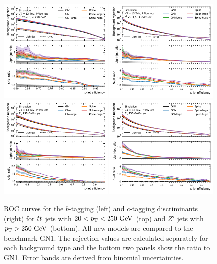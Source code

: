 \begin{figure}[ht]
    \centering
    \includegraphics[width=0.49\textwidth]{figures/flavour_tagging/b_roc_ttbar_large.pdf}
    \includegraphics[width=0.49\textwidth]{figures/flavour_tagging/c_roc_ttbar_large.pdf}
    \includegraphics[width=0.49\textwidth]{figures/flavour_tagging/b_roc_zprime_large.pdf}
    \includegraphics[width=0.49\textwidth]{figures/flavour_tagging/c_roc_zprime_large.pdf}
    \caption{ROC curves for the $b$-tagging (left) and $c$-tagging discriminants (right) for $t\bar{t}$ jets with $20 < \pt < 250~\GeV$ (top) and $Z'$ jets with $\pt > 250~\GeV$ (bottom).
    All new models are compared to the benchmark GN1. The rejection values are calculated separately for each background type and the bottom two panels show the ratio to GN1. Error bands are derived from binomial uncertainties.}
    \label{fig:large_rocs}
\end{figure}


